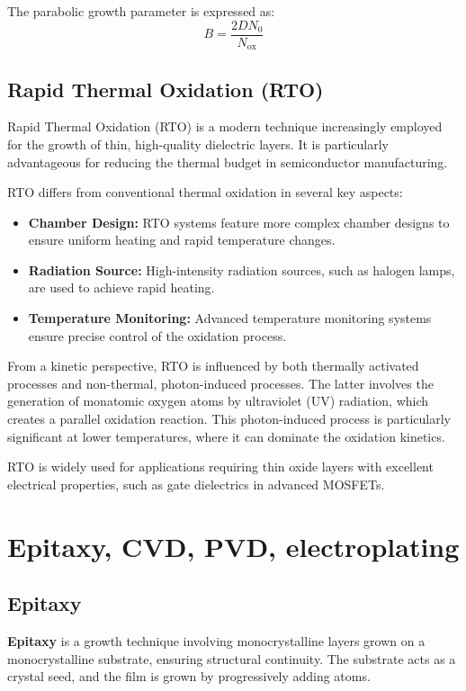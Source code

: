 \documentclass{report}
\begin{document}
The parabolic growth parameter is expressed as:
$$
B = \frac{2D N_{0}}{N_{\text{ox}}}
$$

\section{Rapid Thermal Oxidation (RTO)}

Rapid Thermal Oxidation (RTO) is a modern technique increasingly employed for the growth of thin, high-quality dielectric layers. It is particularly advantageous for reducing the thermal budget in semiconductor manufacturing.

RTO differs from conventional thermal oxidation in several key aspects:
\begin{itemize}
    \item \textbf{Chamber Design:} RTO systems feature more complex chamber designs to ensure uniform heating and rapid temperature changes.
    \item \textbf{Radiation Source:} High-intensity radiation sources, such as halogen lamps, are used to achieve rapid heating.
    \item \textbf{Temperature Monitoring:} Advanced temperature monitoring systems ensure precise control of the oxidation process.
\end{itemize}

From a kinetic perspective, RTO is influenced by both thermally activated processes and non-thermal, photon-induced processes. The latter involves the generation of monatomic oxygen atoms by ultraviolet (UV) radiation, which creates a parallel oxidation reaction. This photon-induced process is particularly significant at lower temperatures, where it can dominate the oxidation kinetics.

RTO is widely used for applications requiring thin oxide layers with excellent electrical properties, such as gate dielectrics in advanced MOSFETs.

\chapter{Epitaxy, CVD, PVD, electroplating}
\section{Epitaxy}
\textbf{Epitaxy} is a growth technique involving monocrystalline layers grown on a monocrystalline substrate, ensuring structural continuity. The substrate acts as a crystal seed, and the film is grown by progressively adding atoms.
\end{document}
